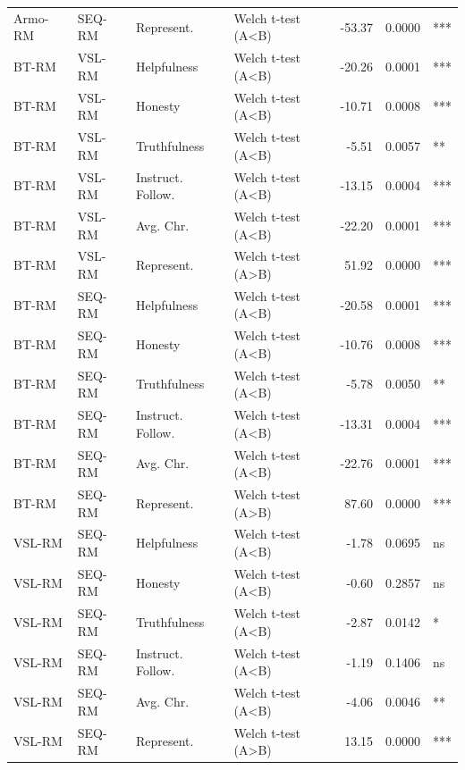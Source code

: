 \documentclass{article}
\begin{document}
\begin{longtable}{llllrrl}
Armo-RM & SEQ-RM & Represent. & Welch t-test (A<B) & -53.37 & 0.0000 & *** \\
BT-RM & VSL-RM & Helpfulness & Welch t-test (A<B) & -20.26 & 0.0001 & *** \\
BT-RM & VSL-RM & Honesty & Welch t-test (A<B) & -10.71 & 0.0008 & *** \\
BT-RM & VSL-RM & Truthfulness & Welch t-test (A<B) & -5.51 & 0.0057 & ** \\
BT-RM & VSL-RM & Instruct. Follow. & Welch t-test (A<B) & -13.15 & 0.0004 & *** \\
BT-RM & VSL-RM & Avg. Chr. & Welch t-test (A<B) & -22.20 & 0.0001 & *** \\
BT-RM & VSL-RM & Represent. & Welch t-test (A>B) & 51.92 & 0.0000 & *** \\
BT-RM & SEQ-RM & Helpfulness & Welch t-test (A<B) & -20.58 & 0.0001 & *** \\
BT-RM & SEQ-RM & Honesty & Welch t-test (A<B) & -10.76 & 0.0008 & *** \\
BT-RM & SEQ-RM & Truthfulness & Welch t-test (A<B) & -5.78 & 0.0050 & ** \\
BT-RM & SEQ-RM & Instruct. Follow. & Welch t-test (A<B) & -13.31 & 0.0004 & *** \\
BT-RM & SEQ-RM & Avg. Chr. & Welch t-test (A<B) & -22.76 & 0.0001 & *** \\
BT-RM & SEQ-RM & Represent. & Welch t-test (A>B) & 87.60 & 0.0000 & *** \\
VSL-RM & SEQ-RM & Helpfulness & Welch t-test (A<B) & -1.78 & 0.0695 & ns \\
VSL-RM & SEQ-RM & Honesty & Welch t-test (A<B) & -0.60 & 0.2857 & ns \\
VSL-RM & SEQ-RM & Truthfulness & Welch t-test (A<B) & -2.87 & 0.0142 & * \\
VSL-RM & SEQ-RM & Instruct. Follow. & Welch t-test (A<B) & -1.19 & 0.1406 & ns \\
VSL-RM & SEQ-RM & Avg. Chr. & Welch t-test (A<B) & -4.06 & 0.0046 & ** \\
VSL-RM & SEQ-RM & Represent. & Welch t-test (A>B) & 13.15 & 0.0000 & *** \\
\end{longtable}
\end{document}
